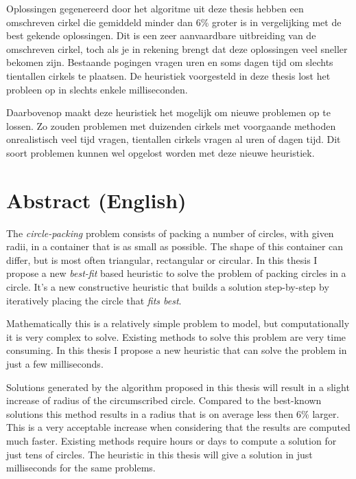 \documentclass[12pt,a4paper,oneside]{book}
\begin{document}
Oplossingen gegenereerd door het algoritme uit deze thesis hebben een omschreven cirkel die gemiddeld minder dan 6\% groter is in vergelijking met de best gekende oplossingen.
Dit is een zeer aanvaardbare uitbreiding van de omschreven cirkel, toch als je in rekening brengt dat deze oplossingen veel sneller bekomen zijn.
Bestaande pogingen vragen uren en soms dagen tijd om slechts tientallen cirkels te plaatsen.
De heuristiek voorgesteld in deze thesis lost het probleen op in slechts enkele milliseconden.

Daarbovenop maakt deze heuristiek het mogelijk om nieuwe problemen op te lossen.
Zo zouden problemen met duizenden cirkels met voorgaande methoden onrealistisch veel tijd vragen, tientallen cirkels vragen al uren of dagen tijd.
Dit soort problemen kunnen wel opgelost worden met deze nieuwe heuristiek.

\newpage

\chapter*{Abstract (English)}

The \textit{circle-packing} problem consists of packing a number of circles, with given radii, in a container that is as small as possible.
The shape of this container can differ, but is most often triangular, rectangular or circular.
In this thesis I propose a new \textit{best-fit} based heuristic to solve the problem of packing circles in a circle.
It's a new constructive heuristic that builds a solution step-by-step by iteratively placing the circle that \textit{fits best}.

Mathematically this is a relatively simple problem to model, but computationally it is very complex to solve.
Existing methods to solve this problem are very time consuming.
In this thesis I propose a new heuristic that can solve the problem in just a few milliseconds.

Solutions generated by the algorithm proposed in this thesis will result in a slight increase of radius of the circumscribed circle.
Compared to the best-known solutions this method results in a radius that is on average less then 6\% larger.
This is a very acceptable increase when considering that the results are computed much faster.
Existing methods require hours or days to compute a solution for just tens of circles.
The heuristic in this thesis will give a solution in just milliseconds for the same problems.
\end{document}
